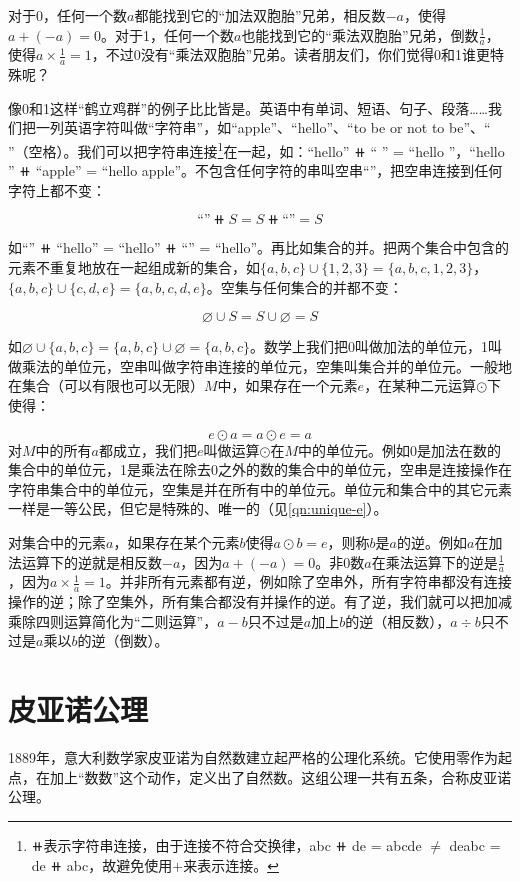 \documentclass[b5paper]{ctexart}
\begin{document}
对于0，任何一个数$a$都能找到它的“加法双胞胎”兄弟，相反数$-a$，使得$a + (-a) = 0$。对于1，任何一个数$a$也能找到它的“乘法双胞胎”兄弟，倒数$\frac{1}{a}$，使得$a \times \frac{1}{a} = 1$，不过0没有“乘法双胞胎”兄弟。读者朋友们，你们觉得0和1谁更特殊呢？

像0和1这样“鹤立鸡群”的例子比比皆是。英语中有单词、短语、句子、段落……我们把一列英语字符叫做“字符串”，如``apple''、``hello''、``to be or not to be''、`` ''（空格）。我们可以把字符串连接\footnote{$\doubleplus$表示字符串连接，由于连接不符合交换律，abc $\doubleplus$ de = abcde $\ne$ deabc = de $\doubleplus$ abc，故避免使用$+$来表示连接。}在一起，如：``hello'' $\doubleplus$ `` '' = ``hello ''，``hello '' $\doubleplus$ ``apple'' = ``hello apple''。不包含任何字符的串叫空串``''，把空串连接到任何字符上都不变：

\[
\text{``''} \doubleplus S = S \doubleplus \text{``''} = S
\]

如``'' $\doubleplus$ ``hello'' = ``hello'' $\doubleplus$ ``'' = ``hello''。再比如集合的并。把两个集合中包含的元素不重复地放在一起组成新的集合，如$\{a, b, c\} \cup \{1, 2, 3\} = \{a, b, c, 1, 2, 3\}$，$\{a, b, c\} \cup \{c, d, e\} = \{a, b, c, d, e\}$。空集与任何集合的并都不变：

\[
\varnothing \cup S = S \cup \varnothing = S
\]

如$\varnothing \cup \{a, b, c\} = \{a, b, c\} \cup \varnothing = \{a, b, c\}$。数学上我们把0叫做加法的单位元，1叫做乘法的单位元，空串叫做字符串连接的单位元，空集叫集合并的单位元。一般地在集合（可以有限也可以无限）$M$中，如果存在一个元素$e$，在某种二元运算$\odot$下使得：

\[
  e \odot a = a \odot e = a
\]
对$M$中的所有$a$都成立，我们把$e$叫做运算$\odot$在$M$中的单位元。例如0是加法在数的集合中的单位元，1是乘法在除去0之外的数的集合中的单位元，空串是连接操作在字符串集合中的单位元，空集是并在所有中的单位元。单位元和集合中的其它元素一样是一等公民，但它是特殊的、唯一的（见\cref{qn:unique-e}）。

 
对集合中的元素$a$，如果存在某个元素$b$使得$a \odot b = e$，则称$b$是$a$的逆。例如$a$在加法运算下的逆就是相反数$-a$，因为$a + (-a) = 0$。非0数$a$在乘法运算下的逆是$\frac{1}{a}$，因为$a \times \frac{1}{a} = 1$。并非所有元素都有逆，例如除了空串外，所有字符串都没有连接操作的逆；除了空集外，所有集合都没有并操作的逆。有了逆，我们就可以把加减乘除四则运算简化为“二则运算”，$a - b$只不过是$a$加上$b$的逆（相反数），$a \div b$只不过是$a$乘以$b$的逆（倒数）。

\section{皮亚诺公理}
\label{sec:peano-axioms}
1889年，意大利数学家皮亚诺为自然数建立起严格的公理化系统。它使用零作为起点，在加上“数数”这个动作，定义出了自然数。这组公理一共有五条，合称皮亚诺公理。
\end{document}
